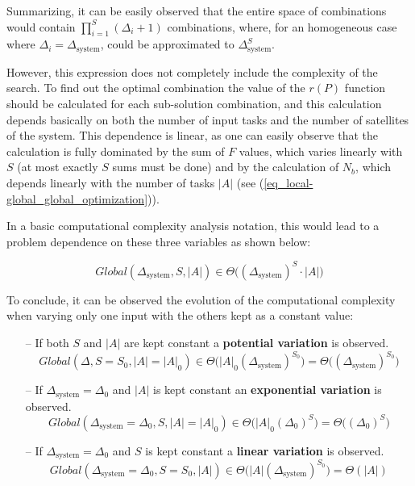 Summarizing, it can be easily observed that the entire space of combinations would contain $\prod_{i=1}^{S}{\left(\Delta_i + 1\right)}$ combinations, where, for an homogeneous case where $\Delta_i = \Delta_{\text{system}}$, could be approximated to $\Delta_{\text{system}}^S$.

However, this expression does not completely include the complexity of the search. To find out the optimal combination the value of the $r(P)$ function should be calculated for each sub-solution combination, and this calculation depends basically on both the number of input tasks and the number of satellites of the system. This dependence is linear, as one can easily observe that the calculation is fully dominated by the sum of $F$ values, which varies linearly with $S$ (at most exactly $S$ sums must be done) and by the calculation of $N_b$, which depends linearly with the number of tasks $|A|$ (see (\ref{eq_local-global_global_optimization})).

In a basic computational complexity analysis notation, this would lead to a problem dependence on these three variables as shown below:

\begin{equation}
\label{eq_LG_complexity}
Global(\Delta_{\text{system}},S,|A|) \in \Theta\big((\Delta_{\text{system}})^S \cdot  |A|\big)
\end{equation}

\indent To conclude, it can be observed the evolution of the computational complexity when varying only one input with the others kept as a constant value:

\begin{itemize}
\item[--] If both $S$ and $|A|$ are kept constant a \textbf{potential variation} is observed.
\begin{equation}
Global(\Delta,S=S_0,|A|=|A|_0) \in \Theta\big(|A|_0(\Delta_{\text{system}})^{S_0}\big)=\Theta\big((\Delta_{\text{system}})^{S_0}\big)
\end{equation}

\item[--] If $\Delta_{\text{system}}=\Delta_0$ and $|A|$ is kept constant an \textbf{exponential variation} is observed.
\begin{equation}
Global(\Delta_{\text{system}}=\Delta_0,S,|A|=|A|_0) \in \Theta\big(|A|_0(\Delta_0)^S\big)=\Theta\big((\Delta_0)^S\big)
\end{equation}

\item[--] If $\Delta_{\text{system}}=\Delta_0$ and $S$ is kept constant a \textbf{linear variation} is observed.
\begin{equation}
Global(\Delta_{\text{system}}=\Delta_0,S=S_0,|A|) \in \Theta\big(|A|(\Delta_{\text{system}})^{S_0}\big)=\Theta(|A|)
\end{equation}

\end{itemize}

